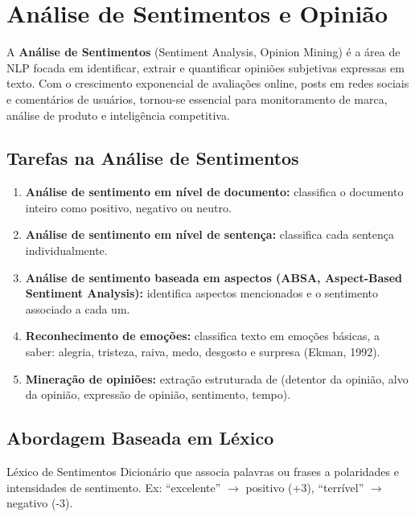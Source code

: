 \documentclass[12pt,a4paper]{article}
\begin{document}
\section{Análise de Sentimentos e Opinião}

A \textbf{Análise de Sentimentos} (Sentiment Analysis, Opinion Mining) é a área de NLP focada em identificar, extrair e quantificar opiniões subjetivas expressas em texto. Com o crescimento exponencial de avaliações online, posts em redes sociais e comentários de usuários, tornou-se essencial para monitoramento de marca, análise de produto e inteligência competitiva.

\subsection{Tarefas na Análise de Sentimentos}

\begin{enumerate}
  \item \textbf{Análise de sentimento em nível de documento:} classifica o documento inteiro como positivo, negativo ou neutro.
  \item \textbf{Análise de sentimento em nível de sentença:} classifica cada sentença individualmente.
  \item \textbf{Análise de sentimento baseada em aspectos (ABSA, Aspect-Based Sentiment Analysis):} identifica aspectos mencionados e o sentimento associado a cada um.
  \item \textbf{Reconhecimento de emoções:} classifica texto em emoções básicas, a saber: alegria, tristeza, raiva, medo, desgosto e surpresa (Ekman, 1992).
  \item \textbf{Mineração de opiniões:} extração estruturada de (detentor da opinião, alvo da opinião, expressão de opinião, sentimento, tempo).
\end{enumerate}

\subsection{Abordagem Baseada em Léxico}

\begin{definicaobox}{Léxico de Sentimentos}
Dicionário que associa palavras ou frases a polaridades e intensidades de sentimento. Ex: ``excelente'' $\to$ positivo (+3), ``terrível'' $\to$ negativo (-3).
\end{definicaobox}
\end{document}
